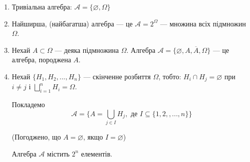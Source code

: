 \begin{example}
    \begin{enumerate}
        \item Тривіальна алгебра:
        $\mathcal{A} = \{\varnothing, \Omega\}$

        \item Найширша, (найбагатша) алгебра --- це
        $\mathcal{A} = 2 ^{\Omega}$ --- множина всіх
        підмножин $\Omega$.

        \item Нехай $A \subset \Omega$ --- деяка підмножина $\Omega$.
        Алгебра $\mathcal{A} = \{\varnothing, A, \overline{A}, \Omega\}$
        --- це алгебра, породжена $A$.

        \item Нехай $\{H_1, H_2, ..., H_n\}$ --- скінченне розбиття
        $\Omega$, тобто: $H_i \cap H_j = \varnothing$ при $i \neq j$        
        і $\bigsqcup\limits_{i=1}^{n} H_i = \Omega$.
        
        Покладемо 
        $$\mathcal{A}
        = \{A = \bigcup\limits_{j \in I} H_j,
        \text{ де } I \subseteq \{ 1, 2,, ..., n \}\}$$
        
        (Погоджено, що $A = \varnothing$, якщо $I = \varnothing$)
        
        Алгебра $\mathcal{A}$ містить $2^n$ елементів.
    \end{enumerate}  
\end{example}

